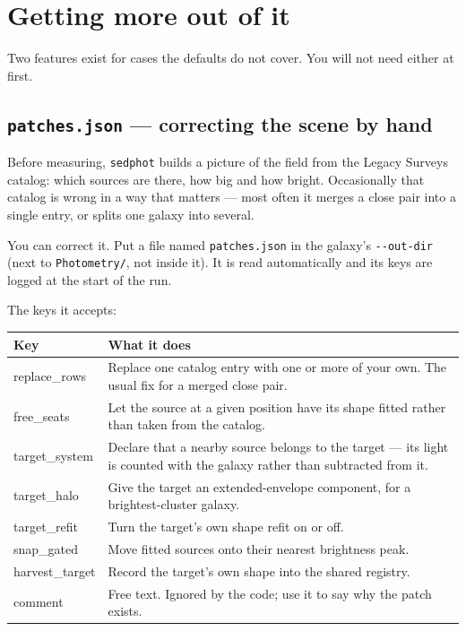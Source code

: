\documentclass[11pt]{article}
\begin{document}
\section{Getting more out of it}
\label{sec:more}

Two features exist for cases the defaults do not cover. You will not need
either at first.

\subsection{\texttt{patches.json} --- correcting the scene by hand}

Before measuring, \texttt{sedphot} builds a picture of the field from the
Legacy Surveys catalog: which sources are there, how big and how bright.
Occasionally that catalog is wrong in a way that matters --- most often it
merges a close pair into a single entry, or splits one galaxy into
several.

You can correct it. Put a file named \texttt{patches.json} in the galaxy's
\texttt{-{}-out-dir} (next to \texttt{Photometry/}, not inside it). It is
read automatically and its keys are logged at the start of the run.

The keys it accepts:

\begin{longtable}{T{3.6cm} L{10.4cm}}
\toprule
\textbf{\normalfont Key} & \textbf{What it does} \\
\midrule
\endhead
replace\_rows & Replace one catalog entry with one or more of your own.
  The usual fix for a merged close pair. \\[2pt]
free\_seats & Let the source at a given position have its shape fitted
  rather than taken from the catalog. \\[2pt]
target\_system & Declare that a nearby source belongs to the target ---
  its light is counted with the galaxy rather than subtracted from
  it. \\[2pt]
target\_halo & Give the target an extended-envelope component, for a
  brightest-cluster galaxy. \\[2pt]
target\_refit & Turn the target's own shape refit on or off. \\[2pt]
snap\_gated & Move fitted sources onto their nearest brightness peak. \\[2pt]
harvest\_target & Record the target's own shape into the shared
  registry. \\[2pt]
comment & Free text. Ignored by the code; use it to say why the patch
  exists. \\
\bottomrule
\end{longtable}
\end{document}
